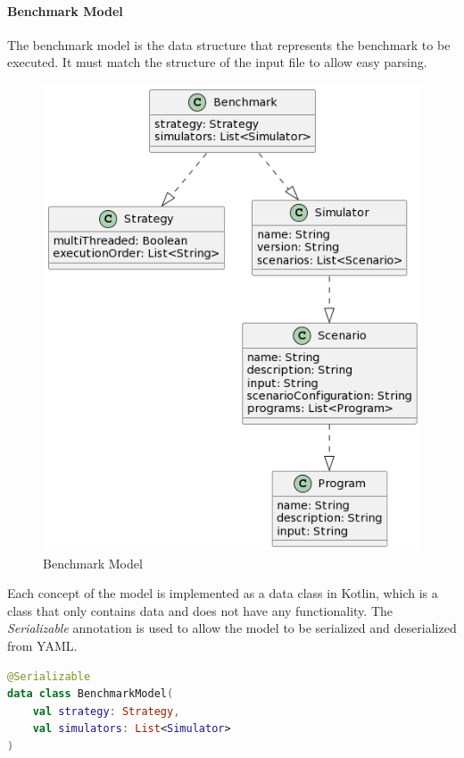 \documentclass[12pt,a4paper,openright,twoside]{book}
\begin{document}
\paragraph*{Benchmark Model}
The benchmark model is the data structure that represents the benchmark to be executed.
It must match the structure of the input file to allow easy parsing.

\begin{figure}[h!]
  \centering
  \includegraphics[width=\textwidth]{figures/benchmark-model.png}
  \caption{Benchmark Model}
  \label{fig:benchmark-model}
\end{figure}

Each concept of the model is implemented as a data class in Kotlin, which is a class that only contains data and does not have any functionality.
The \emph{Serializable} annotation is used to allow the model to be serialized and deserialized from YAML.

\begin{lstlisting}[language=Kotlin]
@Serializable
data class BenchmarkModel(
    val strategy: Strategy,
    val simulators: List<Simulator>
)
\end{lstlisting}
\end{document}
